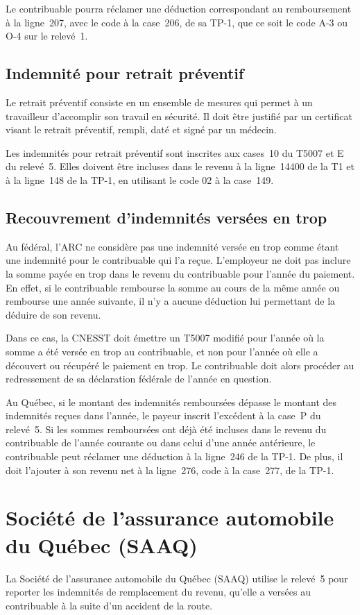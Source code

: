 Le contribuable pourra réclamer une déduction correspondant au remboursement à la ligne~207, avec le code  \fg{} à la case~206, de sa TP-1, que ce soit le code A-3 ou O-4 sur le relevé~1.

\subsection{Indemnité pour retrait préventif}
Le \og retrait préventif \fg{} consiste en un ensemble de mesures qui permet à un travailleur d'accomplir son travail en sécurité. Il doit être justifié par un certificat visant le retrait préventif, rempli, daté et signé par un médecin. 

Les indemnités pour retrait préventif sont inscrites aux cases~10 du T5007 et E du relevé~5. Elles doivent être incluses dans le revenu à la ligne~14400 de la T1 et à la ligne~148 de la TP-1, en utilisant le code 02 à la case~149.

\subsection{Recouvrement d'indemnités versées en trop}
Au fédéral, l'ARC ne considère pas une indemnité versée en trop comme étant une indemnité pour le contribuable qui l'a reçue. L'employeur ne doit pas inclure la somme payée en trop dans le revenu du contribuable pour l'année du paiement. En effet, si le contribuable rembourse la somme au cours de la même année ou rembourse une année suivante, il n'y a aucune déduction lui permettant de la déduire de son revenu. 

Dans ce cas, la CNESST doit émettre un T5007 modifié pour l'année où la somme a été versée en trop au contribuable, et non pour l'année où elle a découvert ou récupéré le paiement en trop. Le contribuable doit alors procéder au redressement de sa déclaration fédérale de l'année en question.

Au Québec, si le montant des indemnités remboursées dépasse le montant des indemnités reçues dans l'année, le payeur inscrit l'excédent à la case~P du relevé~5. Si les sommes remboursées ont déjà été incluses dans le revenu du contribuable de l'année courante ou dans celui d'une année antérieure, le contribuable peut réclamer une déduction à la ligne~246 de la TP-1. De plus, il doit l'ajouter à son revenu net à la ligne~276, code  \fg{} à la case~277, de la TP-1.



\section{Société de l'assurance automobile du Québec (SAAQ)}
\begin{intro}
	La Société de l'assurance automobile du Québec (SAAQ) utilise le relevé~5 pour reporter les indemnités de remplacement du revenu, qu'elle a versées au contribuable à la suite d'un accident de la route.
\end{intro}

